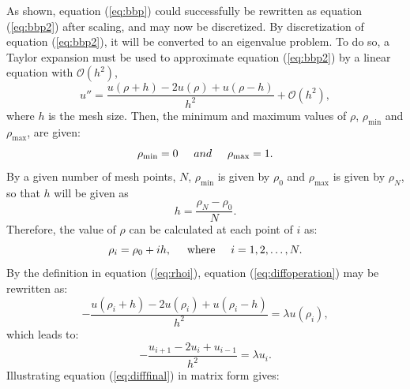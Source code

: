 \documentclass[12pt, a4paper, reqno, article]{amsart}
\begin{document}
As shown, equation (\ref{eq:bbp}) could successfully be rewritten as equation (\ref{eq:bbp2}) after scaling, and may now be discretized. By discretization of equation (\ref{eq:bbp2}), it will be converted to an eigenvalue problem. To do so, a Taylor expansion must be used to approximate equation (\ref{eq:bbp2}) by a linear equation with $\mathcal{O}(h^2)$,
\begin{equation}
    u''=\frac{u(\rho+h) -2u(\rho) +u(\rho-h)}{h^2} + \mathcal{O}(h^2),
    \label{eq:diffoperation}
\end{equation}
where $h$ is the mesh size.
Then, the minimum and maximum values of $\rho$, $\rho_{\textrm{min}}$ and $\rho_\textrm{max}$, are given:
\[
\rho_{\mathrm{min}}=0 \hspace{0.5cm} and \hspace{0.5cm} \rho_{\mathrm{max}}=1.
\]
By a given number of mesh points, $N$, $\rho_{\mathrm{min}}$ is given by $\rho_0$ and $\rho_{\mathrm{max}}$ is given by $\rho_N$, so that $h$ will be given as
\begin{equation}
  h=\frac{\rho_N-\rho_0 }{N}.
  \label{eq:h}
\end{equation}
Therefore, the value of $\rho$ can be calculated at each point of $i$ as:
\begin{equation}
    \rho_i= \rho_0 + ih, \hspace{0.5cm}\textrm{where} \hspace{0.5cm} i=1,2,\dots , N.
    \label{eq:rhoi}
\end{equation}
By the definition in equation (\ref{eq:rhoi}), equation (\ref{eq:diffoperation}) may be rewritten as:
\begin{equation}
-\frac{u(\rho_i+h) -2u(\rho_i) +u(\rho_i-h)}{h^2}  = \lambda u(\rho_i),
\end{equation}
which leads to:
\begin{equation}
-\frac{u_{i+1} -2u_i +u_{i-1} }{h^2}  = \lambda u_i.
\label{eq:difffinal}
\end{equation}
Illustrating equation (\ref{eq:difffinal}) in matrix form gives:
\end{document}
